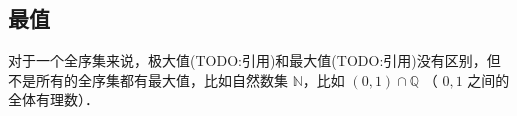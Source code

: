 

\subsection{最值}


对于一个全序集来说，极大值(TODO:引用)和最大值(TODO:引用)没有区别，但不是所有的全序集都有最大值，比如自然数集 $\mathbb{N}$，比如 $(0, 1) \cap \mathbb{Q}$ （ $0, 1$ 之间的全体有理数）．